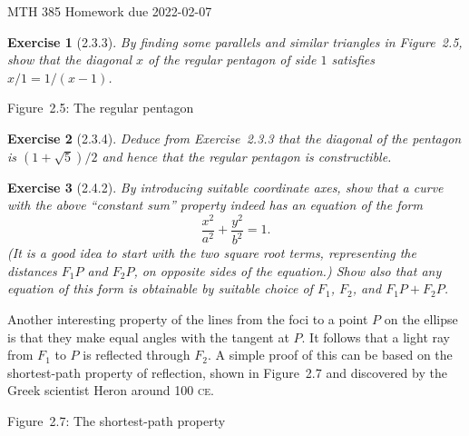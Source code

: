 \documentclass[12pt]{article}
\theoremstyle{plain}
\newtheorem{ex}{Exercise}
\begin{document}
MTH 385 \qquad Homework due 2022-02-07

\begin{ex} [2.3.3]
  By finding some parallels and similar triangles in Figure~2.5, show that the diagonal $x$ of the regular pentagon of side $1$ satisfies $x/1=1/(x-1)$.
\end{ex}

\begin{center}

  Figure~2.5: The regular pentagon
\end{center}

\begin{ex} [2.3.4]
  Deduce from Exercise~2.3.3 that the diagonal of the pentagon is $(1+\sqrt{5})/2$ and hence that the regular pentagon is constructible.
\end{ex}

\begin{ex} [2.4.2]
  By introducing suitable coordinate axes, show that a curve with the above ``constant sum'' property indeed has an equation of the form
  \[
    \frac{x^2}{a^2}+\frac{y^2}{b^2}=1.
  \]
  (It is a good idea to start with the two square root terms, representing the distances $F_1P$ and $F_2P$, on opposite sides of the equation.) Show also that any equation of this form is obtainable by suitable choice of $F_1$, $F_2$, and $F_1P+F_2P$.
\end{ex}

Another interesting property of the lines from the foci to a point $P$ on the ellipse is that they make equal angles with the tangent at $P$. It follows that a light ray from $F_1$ to $P$ is reflected through $F_2$. A simple proof of this can be based on the shortest-path property of reflection, shown in Figure~2.7 and discovered by the Greek scientist Heron around 100 \textsc{ce}.

\begin{center}

  Figure~2.7: The shortest-path property
\end{center}
\end{document}
